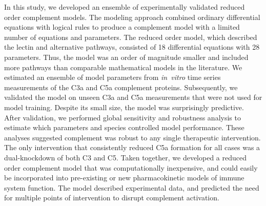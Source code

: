 \documentclass[12pt]{article}
\begin{document}


In this study, we developed an ensemble of experimentally validated reduced order complement models.
The modeling approach combined ordinary differential equations with logical rules to produce a complement model with a limited number of equations and parameters.
The reduced order model,  which described the lectin and alternative pathways, consisted of 18 differential equations with 28 parameters.
Thus, the model was an order of magnitude smaller and included more pathways than comparable mathematical models in the literature.
We estimated an ensemble of model parameters from \textit{in~vitro} time series measurements of the C3a and C5a complement proteins.
Subsequently, we validated the model on unseen C3a and C5a measurements that were not used for model training.
Despite its small size, the model was surprisingly predictive.
After validation, we performed global sensitivity and robustness analysis to estimate which parameters and species
controlled model performance. These analyses suggested complement was robust to any single therapeutic intervention.
The only intervention that consistently reduced C5a formation for all cases was a dual-knockdown of both C3 and C5.
Taken together, we developed a reduced order complement model that was computationally inexpensive,
and could easily be incorporated into pre-existing or new pharmacokinetic models of immune system function.
The model described experimental data, and predicted the need for multiple points of intervention to disrupt complement activation.
\end{document}
